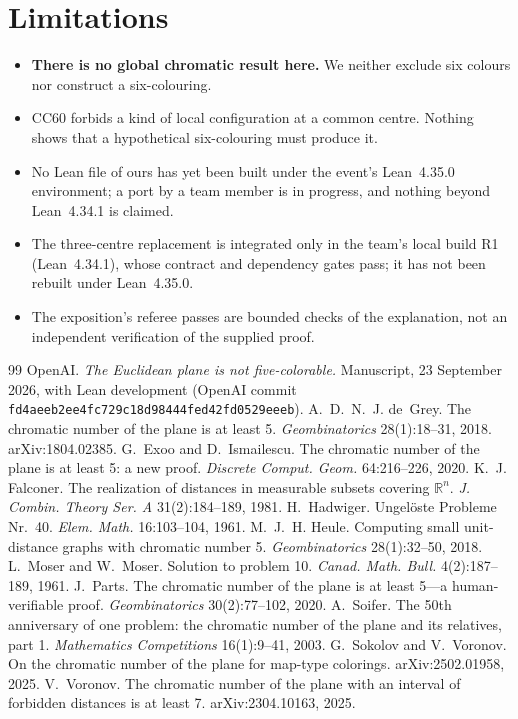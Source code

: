 \documentclass[11pt]{article}
\theoremstyle{definition}
\theoremstyle{remark}
\newcommand{\R}{\mathbb{R}}
\begin{document}
\section{Limitations}
\begin{itemize}
\item \textbf{There is no global chromatic result here.} We neither exclude six colours nor construct a six-colouring.
\item CC60 forbids a kind of local configuration at a common centre. Nothing shows that a hypothetical six-colouring must produce it.
\item No Lean file of ours has yet been built under the event's Lean~4.35.0 environment; a port by a team member is in progress, and nothing beyond Lean~4.34.1 is claimed.
\item The three-centre replacement is integrated only in the team's local build R1 (Lean~4.34.1), whose contract and dependency gates pass; it has not been rebuilt under Lean~4.35.0.
\item The exposition's referee passes are bounded checks of the explanation, not an independent verification of the supplied proof.
\end{itemize}

\begin{thebibliography}{99}
 OpenAI. \emph{The Euclidean plane is not five-colorable.} Manuscript, 23 September 2026, with Lean development (OpenAI commit \texttt{fd4aeeb2ee4fc729c18d98444fed42fd0529eeeb}).
 A.~D.~N.~J. de~Grey. The chromatic number of the plane is at least 5. \emph{Geombinatorics} 28(1):18--31, 2018. arXiv:1804.02385.
 G.~Exoo and D.~Ismailescu. The chromatic number of the plane is at least 5: a new proof. \emph{Discrete Comput. Geom.} 64:216--226, 2020.
 K.~J. Falconer. The realization of distances in measurable subsets covering $\R^n$. \emph{J. Combin. Theory Ser. A} 31(2):184--189, 1981.
 H.~Hadwiger. Ungel\"oste Probleme Nr.~40. \emph{Elem. Math.} 16:103--104, 1961.
 M.~J.~H. Heule. Computing small unit-distance graphs with chromatic number 5. \emph{Geombinatorics} 28(1):32--50, 2018.
 L.~Moser and W.~Moser. Solution to problem 10. \emph{Canad. Math. Bull.} 4(2):187--189, 1961.
 J.~Parts. The chromatic number of the plane is at least 5---a human-verifiable proof. \emph{Geombinatorics} 30(2):77--102, 2020.
 A.~Soifer. The 50th anniversary of one problem: the chromatic number of the plane and its relatives, part 1. \emph{Mathematics Competitions} 16(1):9--41, 2003.
 G.~Sokolov and V.~Voronov. On the chromatic number of the plane for map-type colorings. arXiv:2502.01958, 2025.
 V.~Voronov. The chromatic number of the plane with an interval of forbidden distances is at least 7. arXiv:2304.10163, 2025.
\end{thebibliography}
\end{document}
